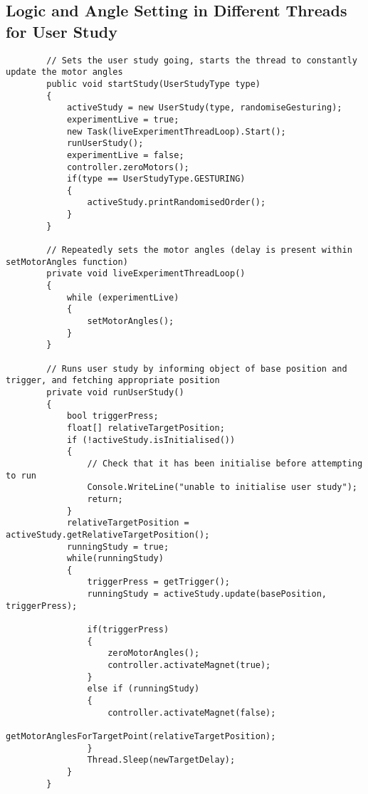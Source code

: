 \subsection{Logic and Angle Setting in Different Threads for User Study}
\begin{lstlisting}
        // Sets the user study going, starts the thread to constantly update the motor angles
        public void startStudy(UserStudyType type)
        {
            activeStudy = new UserStudy(type, randomiseGesturing);
            experimentLive = true;
            new Task(liveExperimentThreadLoop).Start();
            runUserStudy();
            experimentLive = false;
            controller.zeroMotors();
            if(type == UserStudyType.GESTURING)
            {
                activeStudy.printRandomisedOrder();
            }
        }
        
        // Repeatedly sets the motor angles (delay is present within setMotorAngles function)
        private void liveExperimentThreadLoop()
        {
            while (experimentLive)
            {
                setMotorAngles();
            }
        }
        
        // Runs user study by informing object of base position and trigger, and fetching appropriate position
        private void runUserStudy()
        {
            bool triggerPress;
            float[] relativeTargetPosition; 
            if (!activeStudy.isInitialised())
            {
                // Check that it has been initialise before attempting to run
                Console.WriteLine("unable to initialise user study");
                return;
            }
            relativeTargetPosition = activeStudy.getRelativeTargetPosition();
            runningStudy = true;
            while(runningStudy)
            {
                triggerPress = getTrigger();
                runningStudy = activeStudy.update(basePosition, triggerPress);

                if(triggerPress)
                {
                    zeroMotorAngles();
                    controller.activateMagnet(true);
                }
                else if (runningStudy)
                {
                    controller.activateMagnet(false);
                    getMotorAnglesForTargetPoint(relativeTargetPosition);
                }
                Thread.Sleep(newTargetDelay);
            }
        }

\end{lstlisting}